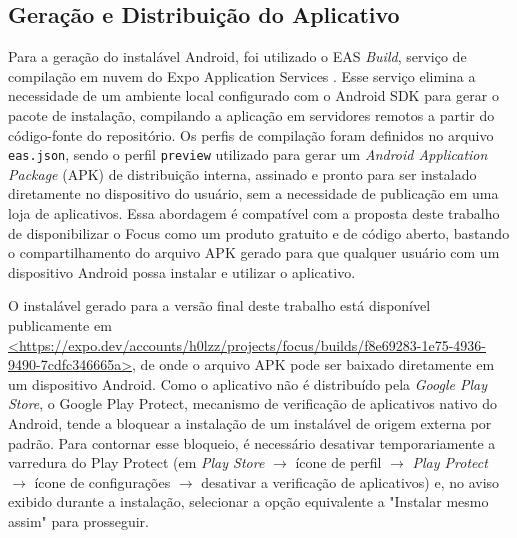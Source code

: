 \subsection{Geração e Distribuição do Aplicativo}

Para a geração do instalável Android, foi utilizado o EAS \textit{Build}, serviço de compilação em nuvem do Expo Application Services \cite{expo_2025}.
Esse serviço elimina a necessidade de um ambiente local configurado com o Android SDK para gerar o pacote de instalação, compilando a aplicação em servidores remotos a partir do código-fonte do repositório.
Os perfis de compilação foram definidos no arquivo \texttt{eas.json}, sendo o perfil \texttt{preview} utilizado para gerar um \textit{Android Application Package} (APK) de distribuição interna, assinado e pronto para ser instalado diretamente no dispositivo do usuário, sem a necessidade de publicação em uma loja de aplicativos.
Essa abordagem é compatível com a proposta deste trabalho de disponibilizar o Focus como um produto gratuito e de código aberto, bastando o compartilhamento do arquivo APK gerado para que qualquer usuário com um dispositivo Android possa instalar e utilizar o aplicativo.

O instalável gerado para a versão final deste trabalho está disponível publicamente em \href{https://expo.dev/accounts/h0lzz/projects/focus/builds/f8e69283-1e75-4936-9490-7cdfc346665a}{<https://expo.dev/\allowbreak{}accounts/\allowbreak{}h0lzz/\allowbreak{}projects/\allowbreak{}focus/\allowbreak{}builds/\allowbreak{}f8e69283-\allowbreak{}1e75-\allowbreak{}4936-\allowbreak{}9490-\allowbreak{}7cdfc346665a>}, de onde o arquivo APK pode ser baixado diretamente em um dispositivo Android.
Como o aplicativo não é distribuído pela \textit{Google Play Store}, o Google Play Protect, mecanismo de verificação de aplicativos nativo do Android, tende a bloquear a instalação de um instalável de origem externa por padrão.
Para contornar esse bloqueio, é necessário desativar temporariamente a varredura do Play Protect (em \textit{Play Store} $\rightarrow$ ícone de perfil $\rightarrow$ \textit{Play Protect} $\rightarrow$ ícone de configurações $\rightarrow$ desativar a verificação de aplicativos) e, no aviso exibido durante a instalação, selecionar a opção equivalente a "Instalar mesmo assim" para prosseguir.
